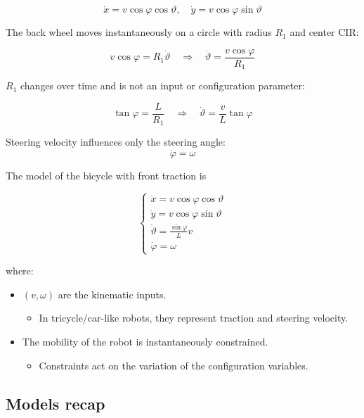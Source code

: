 \[
\dot{x} = v \cos \varphi \cos \vartheta, \quad \dot{y} = v \cos \varphi \sin \vartheta
\]
    
The back wheel moves instantaneously on a circle with radius $R_1$ and center CIR:  

\[
v \cos \varphi = R_1 \dot{\vartheta} \quad \Rightarrow \quad \dot{\vartheta} = \frac{v \cos \varphi}{R_1}
\]
    
$R_1$ changes over time and is not an input or configuration parameter:  

\[
\tan \varphi = \frac{L}{R_1} \quad \Rightarrow \quad \dot{\vartheta} = \frac{v}{L} \tan \varphi
\]
    
Steering velocity influences only the steering angle:  
\[
\dot{\varphi} = \omega
\]

\hfill

The model of the bicycle with front traction is

\[
\begin{cases}
\dot{x} = v \cos \varphi \cos \vartheta \\
\dot{y} = v \cos \varphi \sin \vartheta \\
\dot{\vartheta} = \frac{\sin \varphi}{L} v \\
\dot{\varphi} = \omega
\end{cases}
\]

where:

\begin{itemize}
    \item $(v, \omega)$ are the kinematic inputs.  
    \begin{itemize}
        \item In tricycle/car-like robots, they represent traction and steering velocity.  
    \end{itemize}
    
    \item The mobility of the robot is instantaneously constrained.  
    \begin{itemize}
        \item Constraints act on the variation of the configuration variables.  
    \end{itemize}
\end{itemize}

\hfill

\subsection{Models recap}

